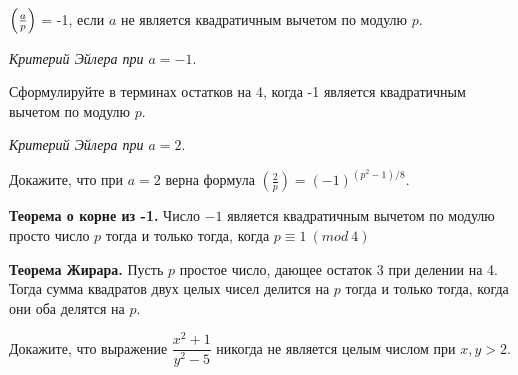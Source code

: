 ${\displaystyle \textstyle \left({\frac {a}{p}}\right)}$ = -1,
если $a$ не является квадратичным вычетом по модулю $p$.

\hspace{3mm}

 \textit{Критерий Эйлера при $a = -1$}. 

\noindent
Сформулируйте в терминах остатков на 4, когда -1 является квадратичным вычетом по модулю $p$.

\textit{Критерий Эйлера при $a = 2$}.

\noindent
Докажите, что при $a=2$ верна формула ${\displaystyle \left({\frac {2}{p}}\right)=(-1)^{(p^{2}-1)/8}.}$

\newpage

\hspace{3mm}

\textbf{Теорема о корне из -1.}
Число $-1$ является квадратичным вычетом по модулю просто число $p$ тогда и только тогда, когда $p \equiv 1 \ (mod \ 4)$

\textbf{Теорема Жирара.} 
Пусть $p$ простое число, дающее остаток 3 при делении на 4. Тогда сумма квадратов двух целых чисел делится на $p$ тогда и только тогда, когда они оба делятся на $p$.

Докажите, что выражение $\dfrac{x^2 + 1}{y^2 - 5}$ никогда не является целым числом при $x, y > 2.$